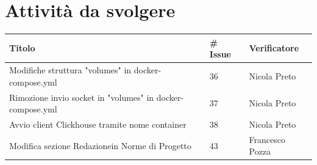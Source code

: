 \documentclass{article}
\begin{document}
\section{Attività da svolgere}
    \begin{center}
        \begin{tabular}{|C{7cm}|C{1,5cm}|C{3cm}|}
            \hline
            \textbf{Titolo} & \textbf{\# Issue} & \textbf{Verificatore} \\
            \hline\hline
            Modifiche struttura "volumes" in docker-compose.yml & 36 & Nicola Preto\\
            
            Rimozione invio socket in "volumes" in docker-compose.yml & 37 & Nicola Preto \\
            
            Avvio client Clickhouse tramite nome container & 38 & Nicola Preto \\
            
            Modifica sezione Redazionein Norme di Progetto & 43 & Francesco Pozza \\
            \hline
        \end{tabular}
    \end{center}
\end{document}
